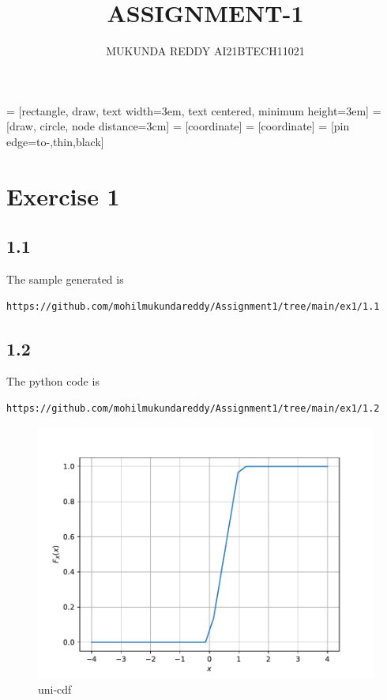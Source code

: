 \documentclass[journal,12pt,twocolumn]{IEEEtran}
\title{ASSIGNMENT-1}
\author{MUKUNDA REDDY AI21BTECH11021}
\date{}
\begin{document}
 = [rectangle, draw,
    text width=3em, text centered, minimum height=3em]
 = [draw, circle, node distance=3cm]
 = [coordinate]
 = [coordinate]
 = [pin edge={to-,thin,black}]

\maketitle
\section*{Exercise 1}
\subsection*{1.1}
The sample generated is
\begin{lstlisting}
https://github.com/mohilmukundareddy/Assignment1/tree/main/ex1/1.1 
\end{lstlisting}
\subsection*{1.2}
The python code is
\begin{lstlisting}
https://github.com/mohilmukundareddy/Assignment1/tree/main/ex1/1.2
\end{lstlisting}
\begin{figure}[H]
    \centering
    \includegraphics[scale = 0.5]{uni_cdf.pdf}
    \caption{uni-cdf}
    \label{fig:my_label1}
\end{figure}
\end{document}
